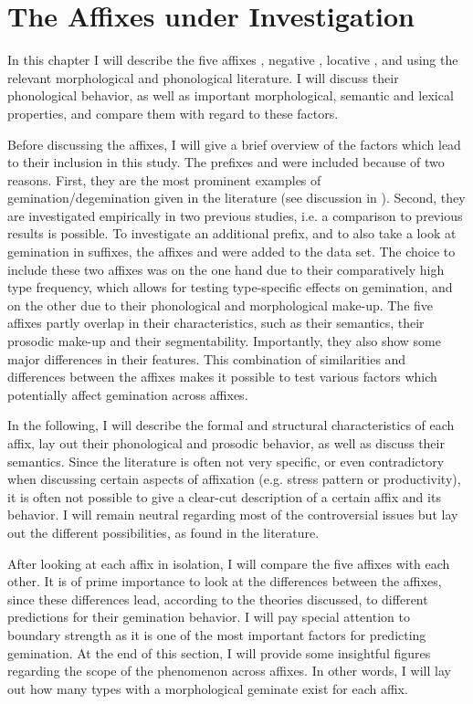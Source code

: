 
\chapter{The Affixes under Investigation}{\label{affixes}}


In this chapter I will describe the five affixes , negative , locative ,  and  using the relevant morphological and phonological literature. I will discuss their phonological behavior, as well as important morphological, semantic and lexical properties, and compare them with regard to these factors.

Before discussing the affixes, I will give a brief overview of the factors which lead to their inclusion in this study.
The prefixes  and  were included because of two reasons.
First, they are the most prominent examples of gemination/degemination given in the literature (see discussion in ).  Second, they are investigated empirically in two previous studies, i.e. a comparison to previous results is possible. 
To investigate an additional prefix, and to also take a look at gemination in suffixes, the affixes  and   were added to the data set. The choice to include these two affixes was on the one hand due to their comparatively high type frequency, which allows for testing type-specific effects on gemination, and  on the other due to their phonological and morphological make-up.
The five affixes partly overlap in their characteristics, such as their semantics, their prosodic make-up and their segmentability. Importantly, they also show some major differences in their features. This combination of similarities and differences between the affixes makes it possible to test various factors which potentially affect gemination across affixes.

In the following, I will describe the formal and structural characteristics of each affix, lay out their phonological and prosodic behavior, as well as discuss their semantics. Since the literature is often not very specific, or even contradictory when discussing certain aspects of affixation (e.g. stress pattern or productivity), it is often not possible to give a clear-cut description of a certain affix and its behavior. I will remain neutral regarding most of the controversial issues but lay out the different possibilities, as found in the literature.  

After looking at each affix in isolation, I will compare the five affixes with each other. It is of prime importance to look at the differences between the affixes, since these differences lead, according to the theories discussed, to different predictions for their gemination behavior. I will pay special attention to boundary strength as it is one of the most important factors for predicting gemination.  
At the end of this section, I will provide some insightful figures regarding the scope of the phenomenon across affixes. In other words, I will lay out how many types with a morphological geminate exist for each affix.

